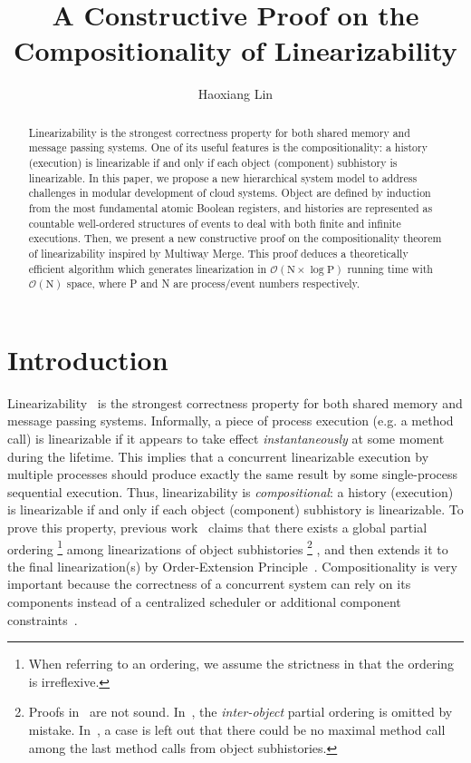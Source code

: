 \documentclass[a4paper,USenglish]{lipics-v2016}
\title{A Constructive Proof on the Compositionality of Linearizability}
\author[1]{Haoxiang Lin}
\affil[1]{
  Microsoft Research,
  Beijing, China\\
  \texttt{haoxlin@microsoft.com}
}
\newcommand{\lin}{linearizability}
\newcommand{\linb}{linearizable}
\newcommand{\Lin}{Linearizability}
\newcommand{\linz}{linearization}
\begin{document}
\maketitle


\begin{abstract}\label{sec:abs}	
	{\Lin} is the strongest correctness property for both shared memory and message passing systems.
	One of its useful features is the compositionality:
	a history (execution) is {\linb} if and only if each object (component) subhistory is {\linb}.
	In this paper, we propose a new hierarchical system model to address challenges in modular development of cloud systems.
	Object are defined by induction from the most fundamental atomic Boolean registers,
	and histories are represented as countable well-ordered structures of events
	to deal with both finite and infinite executions.
	Then, we present a new constructive proof on the
	compositionality theorem of {\lin} inspired by Multiway Merge.
	This proof deduces a theoretically efficient algorithm which generates {\linz}
	in $\mathcal{O}(\text{N}\times\log{}\text{P})$ running time with $\mathcal{O}(\text{N})$ space,
	where P and N are process/event numbers respectively.
\end{abstract}

\newpage

\section{Introduction}\label{sec:intro}

{\Lin}~\cite{Herlihy90} is the strongest correctness property for both shared memory and message passing systems.
Informally, a piece of process execution (e.g. a method call)
is {\linb} if it appears to take effect \textit{instantaneously} at some moment during the lifetime.
This implies that a concurrent {\linb} execution by multiple processes
should produce exactly the same result by some single-process sequential execution.
Thus, {\lin} is \textit{compositional}: a history (execution) is {\linb} if and only if each object (component) subhistory is {\linb}.
To prove this property, previous work~\cite{Herlihy86, Herlihy87, Herlihy90, Herlihy08} claims that there exists a global partial ordering
\footnote
{
	When referring to an ordering, we assume the strictness in that the ordering is irreflexive.
}
among {\linz}s of object subhistories
\footnote
{
	Proofs in~\cite{Herlihy86, Herlihy87, Herlihy08} are not sound.
	In~\cite{Herlihy86, Herlihy87}, the \textit{inter-object} partial ordering is omitted by mistake.
	In~\cite{Herlihy08}, a case is left out that there could be no maximal method call among the last method calls from object subhistories.
}
, and then extends it to the final {\linz}(s) by Order-Extension Principle~\cite{Szpilrajn30}.
Compositionality is very important because the correctness of a concurrent system can rely on its components instead of a centralized scheduler or additional component constraints~\cite{Herlihy90, Herlihy08}.
\end{document}
